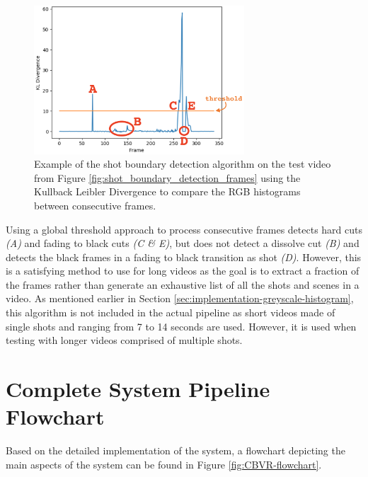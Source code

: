 \begin{figure}[h] 
\centerline{\includegraphics[width=0.70\textwidth]{figures/implementation/shot_boundary_detection_example.png}}
\caption{\label{fig:shot_boundary_detection_example}Example of the shot boundary detection algorithm on the test video from Figure \ref{fig:shot_boundary_detection_frames} using the Kullback Leibler Divergence to compare the RGB histograms between consecutive frames.}
\end{figure}

Using a global threshold approach to process consecutive frames detects hard cuts \textit{(A)} and fading to black cuts \textit{(C \& E)}, but does not detect a dissolve cut \textit{(B)} and detects the black frames in a fading to black transition as shot \textit{(D)}. However, this is a satisfying method to use for long videos as the goal is to extract a fraction of the frames rather than generate an exhaustive list of all the shots and scenes in a video. As mentioned earlier in Section \ref{sec:implementation-greyscale-histogram}, this algorithm is not included in the actual pipeline as short videos made of single shots and ranging from 7 to 14 seconds are used. However, it is used when testing with longer videos comprised of multiple shots.


\section{Complete System Pipeline Flowchart}

Based on the detailed implementation of the system, a flowchart depicting the main aspects of the system can be found in Figure \ref{fig:CBVR-flowchart}.

